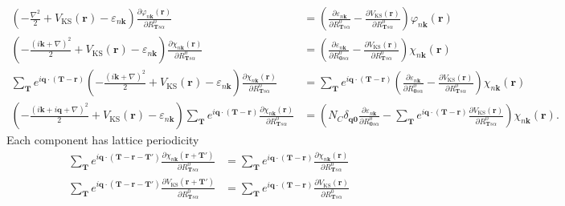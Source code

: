 \documentclass{article}
\begin{document}
\begin{align}
    \left(-\frac{\nabla^2}{2}+V_\textrm{KS}(\textbf{r}) - \varepsilon_{n\textbf{k}} \right)
    \frac{\partial \varphi_{n\textbf{k}}(\textbf{r})}{\partial R^0_{\textbf{T}s\alpha}}
    &=
    \left(\frac{\partial \varepsilon_{n\textbf{k}}}{\partial R^0_{\textbf{T}s\alpha}}
    -\frac{\partial V_\textrm{KS}(\textbf{r})}{\partial R^0_{\textbf{T}s\alpha}}\right)
    \varphi_{n\textbf{k}}(\textbf{r})
    \nonumber \\
    \left(-\frac{(i\textbf{k}+\nabla)^2}{2}+V_\textrm{KS}(\textbf{r}) - \varepsilon_{n\textbf{k}} \right)
    \frac{\partial \chi_{n\textbf{k}}(\textbf{r})}{\partial R^0_{\textbf{T}s\alpha}}
    &=
    \left(\frac{\partial \varepsilon_{n\textbf{k}}}{\partial R^0_{\textbf{0}s\alpha}}
    -\frac{\partial V_\textrm{KS}(\textbf{r})}{\partial R^0_{\textbf{T}s\alpha}}\right)
    \chi_{n\textbf{k}}(\textbf{r})
    \nonumber \\
    \sum_{\textbf{T}}e^{i\textbf{q}\cdot(\textbf{T}-\textbf{r})} 
    \left(-\frac{(i\textbf{k}+\nabla)^2}{2}+V_\textrm{KS}(\textbf{r}) - \varepsilon_{n\textbf{k}} \right)
    \frac{\partial \chi_{n\textbf{k}}(\textbf{r})}{\partial R^0_{\textbf{T}s\alpha}}
    &=
    \sum_{\textbf{T}}e^{i\textbf{q}\cdot(\textbf{T}-\textbf{r})} 
    \left(\frac{\partial \varepsilon_{n\textbf{k}}}{\partial R^0_{\textbf{0}s\alpha}}
    -\frac{\partial V_\textrm{KS}(\textbf{r})}{\partial R^0_{\textbf{T}s\alpha}}\right)
    \chi_{n\textbf{k}}(\textbf{r})
    \nonumber \\
    \left(-\frac{(i\textbf{k}+i\textbf{q}+\nabla)^2}{2}+V_\textrm{KS}(\textbf{r}) - \varepsilon_{n\textbf{k}} \right)
    \sum_{\textbf{T}}e^{i\textbf{q}\cdot(\textbf{T}-\textbf{r})} 
    \frac{\partial \chi_{n\textbf{k}}(\textbf{r})}{\partial R^0_{\textbf{T}s\alpha}}
    &=
    \left(N_C \delta_{\textbf{q}\textbf{0}}\frac{\partial \varepsilon_{n\textbf{k}}}{\partial R^0_{\textbf{0}s\alpha}}
    -\sum_{\textbf{T}}e^{i\textbf{q}\cdot(\textbf{T}-\textbf{r})} 
    \frac{\partial V_\textrm{KS}(\textbf{r})}{\partial R^0_{\textbf{T}s\alpha}}\right)
    \chi_{n\textbf{k}}(\textbf{r}).
\end{align}
Each component has lattice periodicity
\begin{align}
    \sum_{\textbf{T}}e^{i\textbf{q}\cdot(\textbf{T}-\textbf{r}-\textbf{T}')} 
    \frac{\partial \chi_{n\textbf{k}}(\textbf{r}+\textbf{T}')}{\partial R^0_{\textbf{T}s\alpha}}
    &=
    \sum_{\textbf{T}}e^{i\textbf{q}\cdot(\textbf{T}-\textbf{r})} 
    \frac{\partial \chi_{n\textbf{k}}(\textbf{r})}{\partial R^0_{\textbf{T}s\alpha}}
    \\
    \sum_{\textbf{T}}e^{i\textbf{q}\cdot(\textbf{T}-\textbf{r}-\textbf{T}')} 
    \frac{\partial V_\textrm{KS}(\textbf{r}+\textbf{T}')}{\partial R^0_{\textbf{T}s\alpha}}
    &=
    \sum_{\textbf{T}}e^{i\textbf{q}\cdot(\textbf{T}-\textbf{r})} 
    \frac{\partial V_\textrm{KS}(\textbf{r})}{\partial R^0_{\textbf{T}s\alpha}}
\end{align}
\end{document}
